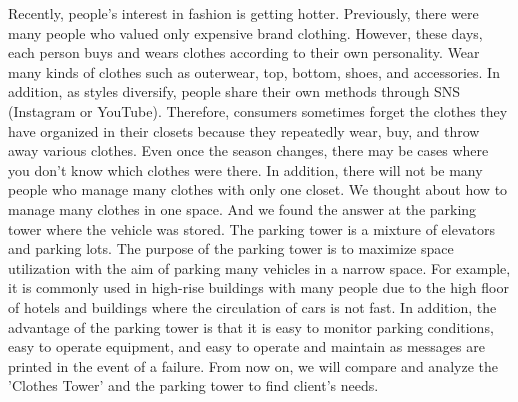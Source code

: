 \documentclass[conference]{IEEEtran}
\begin{document}
Recently, people's interest in fashion is getting hotter. Previously, there were many people who valued only expensive brand clothing. However, these days, each person buys and wears clothes according to their own personality. Wear many kinds of clothes such as outerwear, top, bottom, shoes, and accessories. In addition, as styles diversify, people share their own methods through SNS (Instagram or YouTube). Therefore, consumers sometimes forget the clothes they have organized in their closets because they repeatedly wear, buy, and throw away various clothes. Even once the season changes, there may be cases where you don't know which clothes were there. In addition, there will not be many people who manage many clothes with only one closet. We thought about how to manage many clothes in one space. And we found the answer at the parking tower where the vehicle was stored.
The parking tower is a mixture of elevators and parking lots. The purpose of the parking tower is to maximize space utilization with the aim of parking many vehicles in a narrow space. For example, it is commonly used in high-rise buildings with many people due to the high floor of hotels and buildings where the circulation of cars is not fast. In addition, the advantage of the parking tower is that it is easy to monitor parking conditions, easy to operate equipment, and easy to operate and maintain as messages are printed in the event of a failure.
From now on, we will compare and analyze the 'Clothes Tower' and the parking tower to find client’s needs.
\end{document}
